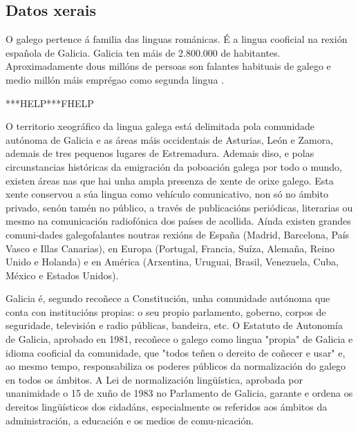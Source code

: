     

\clearpage



\begin{multicols}{2}

\subsection{Datos xerais}

    O galego pertence á familia das linguas románicas. É a lingua cooficial na rexión española de Galicia. Galicia ten máis de 2.800.000 de habitantes. Aproximadamente dous millóns de persoas son falantes habituais de galego e medio millón máis emprégao como segunda lingua \cite{GAL-Nota5,GAL-Nota6}.

***HELP***FHELP

O territorio xeográfico da lingua galega está delimitada pola comunidade autónoma de Galicia e as áreas máis occidentais de Asturias, León e Zamora, ademais de tres pequenos lugares de Estremadura. Ademais diso, e polas circunstancias históricas da emigración da poboación galega por todo o mundo, existen áreas nas que hai unha ampla presenza de xente de orixe galego. Esta xente conservou a súa lingua como vehículo comunicativo, non só no ámbito privado, senón tamén no público, a través de publicacións periódicas, literarias ou mesmo na comunicación radiofónica dos países de acollida. Aínda existen grandes comuni-dades galegofalantes noutras rexións de España (Madrid, Barcelona, País Vasco e Illas Canarias), en Europa (Portugal, Francia, Suíza, Alemaña, Reino Unido e Holanda) e en América (Arxentina, Uruguai, Brasil, Venezuela, Cuba, México e Estados Unidos).
 
Galicia é, segundo recoñece a Constitución, unha comunidade autónoma que conta con institucións propias: o seu propio parlamento, goberno, corpos de seguridade, televisión e radio públicas, bandeira, etc. O Estatuto de Autonomía de Galicia, aprobado en 1981, recoñece o galego como lingua "propia" de Galicia e idioma cooficial da comunidade, que "todos teñen o dereito de coñecer e usar" e, ao mesmo tempo, responsabiliza os poderes públicos da normalización do galego en todos os ámbitos. A Lei de normalización lingüística, aprobada por unanimidade o 15 de xuño de 1983 no Parlamento de Galicia, garante e ordena os dereitos lingüísticos dos cidadáns, especialmente os referidos aos ámbitos da administración, a educación e os medios de comu-nicación. 


\end{multicols}
